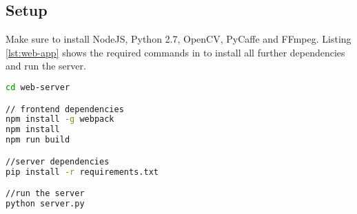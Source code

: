 \subsection{Setup}
Make sure to install NodeJS, Python 2.7, OpenCV, PyCaffe and FFmpeg. Listing \ref{lst:web-app} shows the required commands in to install all further dependencies and run the server.

\begin{lstlisting}[language=sh, caption=Web Application Setup, label=lst:web-app]
cd web-server

// frontend dependencies
npm install -g webpack
npm install
npm run build

//server dependencies
pip install -r requirements.txt

//run the server
python server.py
\end{lstlisting}
